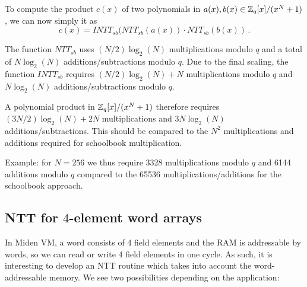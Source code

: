\begin{algorithm}[!t] \label{algo:intt_sb}
\begin{scriptsize}
\caption{\emph{$INTT_{sb}$}}
\end{scriptsize}
\end{algorithm} 

To compute the product $c(x)$ of two polynomials in $a(x), b(x) \in \mathbb{Z}_q[x]/(x^N+1)$, we can now simply it as 
\[  c(x) = INTT_{sb}(NTT_{sb}(a(x)) \cdot NTT_{sb}(b(x)) \, . \]

The function $NTT_{sb}$ uses $(N/2) \log_2(N)$ multiplications modulo $q$ and a total of $N \log_2(N)$ additions/subtractions modulo $q$.
Due to the final scaling, the function $INTT_{sb}$ requires $(N/2) \log_2(N) + N$ multiplications modulo $q$ and 
$N \log_2(N)$ additions/subtractions modulo $q$.

A polynomial product in $\mathbb{Z}_q[x]/(x^N+1)$ therefore requires $(3N/2) \log_2(N) + 2N$ multiplications and $3 N \log_2(N)$ 
additions/subtractions.  This should be compared to the $N^2$ multiplications and additions required for schoolbook multiplication.

Example: for $N = 256$ we thus require 3328 multiplications modulo $q$ and 6144 additions modulo $q$ compared to the 
65536 multiplications/additions for the schoolbook approach.

\subsection{NTT for $4$-element word arrays}

In Miden VM, a word consists of $4$ field elements and the RAM is addressable by words, so we can read or write 4 field
elements in one cycle.  As such, it is interesting to develop an NTT routine which takes into account the word-addressable
memory.   We see two possibilities depending on the application:

